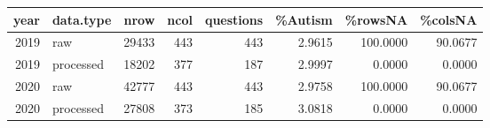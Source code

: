 \begin{tabular}{rlrrrrrr}
  \hline
year & data.type & nrow & ncol & questions & \%Autism & \%rowsNA & \%colsNA \\ 
  \hline
 2019 & raw & 29433 &   443 &   443 & 2.9615 & 100.0000 & 90.0677 \\ 
   2019 & processed & 18202 &   377 &   187 & 2.9997 & 0.0000 & 0.0000 \\ 
   2020 & raw & 42777 &   443 &   443 & 2.9758 & 100.0000 & 90.0677 \\ 
   2020 & processed & 27808 &   373 &   185 & 3.0818 & 0.0000 & 0.0000 \\ 
   \hline
\end{tabular}
